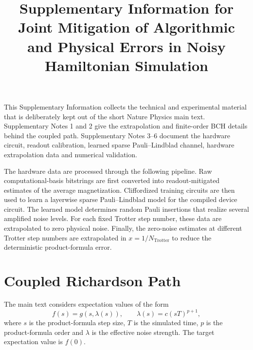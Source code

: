 \documentclass[11pt]{article}
\title{Supplementary Information for\\
Joint Mitigation of Algorithmic and Physical Errors in Noisy Hamiltonian Simulation}
\author{}
\date{}
\begin{document}
\maketitle

This Supplementary Information collects the technical and experimental material that is deliberately kept out of the short Nature Physics main text. Supplementary Notes 1 and 2 give the extrapolation and finite-order BCH details behind the coupled path. Supplementary Notes 3--6 document the hardware circuit, readout calibration, learned sparse Pauli--Lindblad channel, hardware extrapolation data and numerical validation.

The hardware data are processed through the following pipeline. Raw computational-basis bitstrings are first converted into readout-mitigated estimates of the average magnetization. Cliffordized training circuits are then used to learn a layerwise sparse Pauli--Lindblad model for the compiled device circuit. The learned model determines random Pauli insertions that realize several amplified noise levels. For each fixed Trotter step number, these data are extrapolated to zero physical noise. Finally, the zero-noise estimates at different Trotter step numbers are extrapolated in $x=1/N_{\mathrm{Trotter}}$ to reduce the deterministic product-formula error.

\section{Coupled Richardson Path}

The main text considers expectation values of the form
\begin{equation}
    f(s)=g(s,\lambda(s)),\qquad
    \lambda(s)=c(sT)^{p+1},
\end{equation}
where $s$ is the product-formula step size, $T$ is the simulated time, $p$ is the product-formula order and $\lambda$ is the effective noise strength. The target expectation value is $f(0)$.
\end{document}
